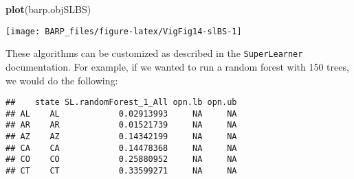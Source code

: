 \documentclass[]{article}
\newenvironment{Shaded}{\begin{snugshade}}{\end{snugshade}}
\newcommand{\KeywordTok}[1]{\textcolor[rgb]{0.13,0.29,0.53}{\textbf{#1}}}
\newcommand{\DataTypeTok}[1]{\textcolor[rgb]{0.13,0.29,0.53}{#1}}
\newcommand{\DecValTok}[1]{\textcolor[rgb]{0.00,0.00,0.81}{#1}}
\newcommand{\StringTok}[1]{\textcolor[rgb]{0.31,0.60,0.02}{#1}}
\newcommand{\OperatorTok}[1]{\textcolor[rgb]{0.81,0.36,0.00}{\textbf{#1}}}
\newcommand{\NormalTok}[1]{#1}
\begin{document}
\begin{Shaded}
\begin{Highlighting}[]
\KeywordTok{plot}\NormalTok{(barp.objSLBS)}
\end{Highlighting}
\end{Shaded}

\begin{center}\texttt{[image: BARP\_files/figure-latex/VigFig14-slBS-1]} \end{center}

These algorithms can be customized as described in the
\texttt{SuperLearner} documentation. For example, if we wanted to run a
random forest with 150 trees, we would do the following:

\begin{Shaded}
\end{Shaded}

\begin{Shaded}
\end{Shaded}

\begin{verbatim}
##    state SL.randomForest_1_All opn.lb opn.ub
## AL    AL            0.02913993     NA     NA
## AR    AR            0.01521739     NA     NA
## AZ    AZ            0.14342199     NA     NA
## CA    CA            0.14478368     NA     NA
## CO    CO            0.25880952     NA     NA
## CT    CT            0.33599271     NA     NA
\end{verbatim}
\end{document}
